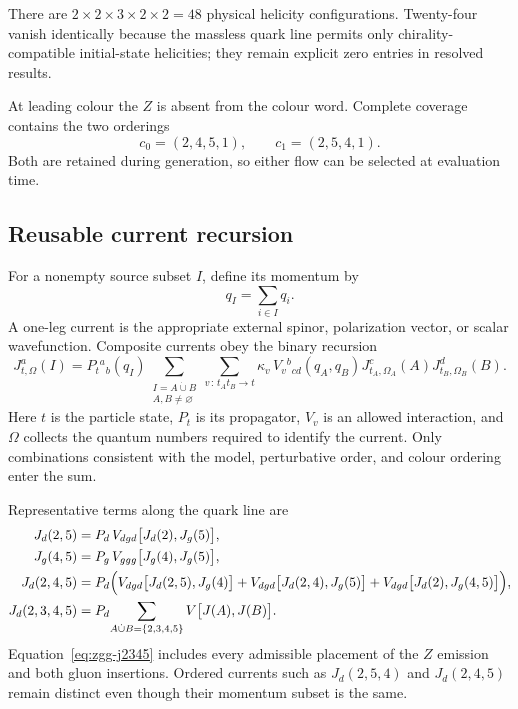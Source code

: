 There are \(2\times2\times3\times2\times2=48\) physical helicity
configurations.  Twenty-four vanish identically because the massless quark line
permits only chirality-compatible initial-state helicities; they remain
explicit zero entries in resolved results.

At leading colour the \(Z\) is absent from the colour word.  Complete coverage
contains the two orderings
\begin{equation}
  c_0=(2,4,5,1),\qquad c_1=(2,5,4,1).
  \label{eq:zgg-physical-flows}
\end{equation}
Both are retained during generation, so either flow can be selected at
evaluation time.

\subsection{Reusable current recursion}

For a nonempty source subset \(I\), define its momentum by
\begin{equation}
  q_I=\sum_{i\in I}q_i .
  \label{eq:zgg-subset-mask}
\end{equation}
A one-leg current is the appropriate external spinor, polarization vector, or
scalar wavefunction.  Composite currents obey the binary recursion
\begin{equation}
  J_{t,\Omega}^{a}(I)
  =P_t{}^{a}{}_{b}(q_I)
   \sum_{\substack{I=A\mathbin{\dot\cup}B\\
                   A,B\ne\varnothing}}
   \sum_{v\,:\,t_A t_B\to t}
   \kappa_v\,
   V_v{}^{b}{}_{cd}(q_A,q_B)
   J_{t_A,\Omega_A}^{c}(A)
   J_{t_B,\Omega_B}^{d}(B).
  \label{eq:zgg-current-recursion}
\end{equation}
Here \(t\) is the particle state, \(P_t\) is its propagator, \(V_v\) is an
allowed interaction, and \(\Omega\) collects the quantum numbers required to
identify the current.  Only combinations consistent with the model,
perturbative order, and colour ordering enter the sum.

Representative terms along the quark line are
\begin{align}
 J_d(2,5) &={P}_d\,V_{dgd}\bigl[J_d(2),J_g(5)\bigr],
 \label{eq:zgg-j25}\\
 J_g(4,5) &={P}_g\,V_{ggg}\bigl[J_g(4),J_g(5)\bigr],
 \label{eq:zgg-j45}\\
 J_d(2,4,5) &={P}_d\Bigl(
     V_{dgd}\bigl[J_d(2,5),J_g(4)\bigr]
    +V_{dgd}\bigl[J_d(2,4),J_g(5)\bigr]
    +V_{dgd}\bigl[J_d(2),J_g(4,5)\bigr]
  \Bigr),
 \label{eq:zgg-j245}\\
 J_d(2,3,4,5) &={P}_d\!\sum_{A\dot\cup B=\{2,3,4,5\}}
   V\bigl[J(A),J(B)\bigr].
 \label{eq:zgg-j2345}
\end{align}
Equation~\eqref{eq:zgg-j2345} includes every admissible placement of the
\(Z\) emission and both gluon insertions.  Ordered currents such as
\(J_d(2,5,4)\) and \(J_d(2,4,5)\) remain distinct even though their momentum
subset is the same.


